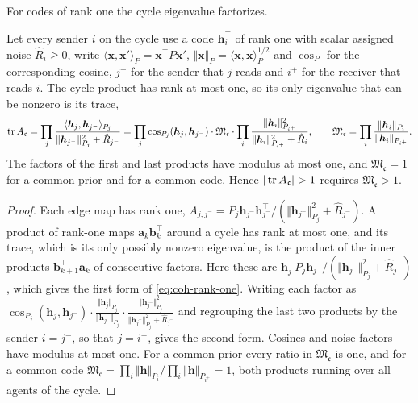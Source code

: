 For codes of rank one the cycle eigenvalue factorizes.

\begin{lemma}\label{lem:coh-rank-one}
Let every sender $i$ on the cycle use a code $\bm h_i^\top$ of rank one with scalar assigned noise $\hat R_i\ge0$, write $\langle\bm x,\bm x'\rangle_P=\bm x^\top P\bm x'$, $\Vert\bm x\Vert_P=\langle\bm x,\bm x\rangle_P^{1/2}$ and $\cos_P$ for the corresponding cosine, $j^-$ for the sender that $j$ reads and $i^+$ for the receiver that reads $i$. The cycle product has rank at most one, so its only eigenvalue that can be nonzero is its trace,
\begin{equation}\label{eq:coh-rank-one}
\operatorname{tr} A_{\mathfrak c}=\prod_j\frac{\langle\bm h_j,\bm h_{j^-}\rangle_{P_j}}{\Vert\bm h_{j^-}\Vert^2_{P_j}+\hat R_{j^-}}=\prod_j\cos_{P_j}(\bm h_j,\bm h_{j^-})\cdot\mathfrak M_{\mathfrak c}\cdot\prod_i\frac{\Vert\bm h_i\Vert^2_{P_{i^+}}}{\Vert\bm h_i\Vert^2_{P_{i^+}}+\hat R_i},\qquad\mathfrak M_{\mathfrak c}=\prod_i\frac{\Vert\bm h_i\Vert_{P_i}}{\Vert\bm h_i\Vert_{P_{i^+}}}.
\end{equation}
The factors of the first and last products have modulus at most one, and $\mathfrak M_{\mathfrak c}=1$ for a common prior and for a common code. Hence $|\tr A_{\mathfrak c}|>1$ requires $\mathfrak M_{\mathfrak c}>1$.
\end{lemma}

\begin{proof}
Each edge map has rank one, $A_{j,j^-}=P_j\bm h_{j^-}\bm h_{j^-}^\top/(\Vert\bm h_{j^-}\Vert^2_{P_j}+\hat R_{j^-})$. A product of rank-one maps $\bm a_k\bm b_k^\top$ around a cycle has rank at most one, and its trace, which is its only possibly nonzero eigenvalue, is the product of the inner products $\bm b_{k+1}^\top\bm a_k$ of consecutive factors. Here these are $\bm h_j^\top P_j\bm h_{j^-}/(\Vert\bm h_{j^-}\Vert^2_{P_j}+\hat R_{j^-})$, which gives the first form of \eqref{eq:coh-rank-one}. Writing each factor as $\cos_{P_j}(\bm h_j,\bm h_{j^-})\cdot\frac{\Vert\bm h_j\Vert_{P_j}}{\Vert\bm h_{j^-}\Vert_{P_j}}\cdot\frac{\Vert\bm h_{j^-}\Vert^2_{P_j}}{\Vert\bm h_{j^-}\Vert^2_{P_j}+\hat R_{j^-}}$ and regrouping the last two products by the sender $i=j^-$, so that $j=i^+$, gives the second form. Cosines and noise factors have modulus at most one. For a common prior every ratio in $\mathfrak M_{\mathfrak c}$ is one, and for a common code $\mathfrak M_{\mathfrak c}=\prod_i\Vert\bm h\Vert_{P_i}/\prod_i\Vert\bm h\Vert_{P_{i^+}}=1$, both products running over all agents of the cycle.
\end{proof}

